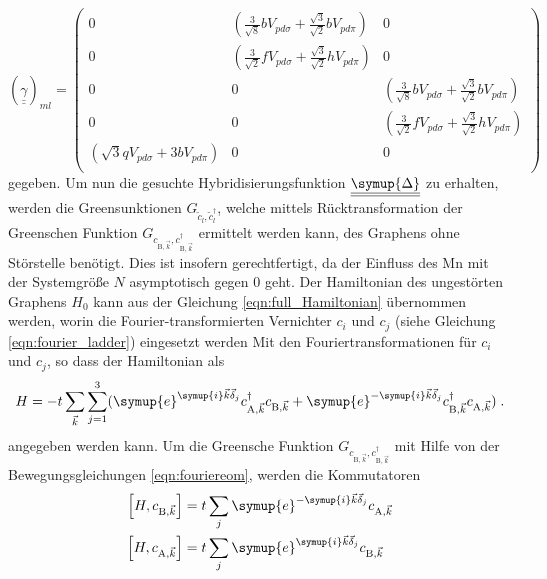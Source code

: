 \begin{equation*}
   \left (  \underline{\underline{\gamma}} \right )_{ml}= 
    \begin{pmatrix}
        0               & \left ( \frac{3}{\sqrt{8}} b V_{pd\sigma} + \frac{\sqrt{3}}{\sqrt{2}}  b   V_{pd\pi} \right )    &   0           \\
        0               & \left ( \frac{3}{\sqrt{2}} f V_{pd\sigma} + \frac{\sqrt{3}}{\sqrt{2}}  h   V_{pd\pi} \right )   &   0           \\
        0               & 0             &   \left ( \frac{3}{\sqrt{8}} b V_{pd\sigma} + \frac{\sqrt{3}}{\sqrt{2}}  b   V_{pd\pi} \right ) \\
        0               & 0             &   \left ( \frac{3}{\sqrt{2}} f V_{pd\sigma} + \frac{\sqrt{3}}{\sqrt{2}}  h   V_{pd\pi} \right ) \\
        \left (  \sqrt{3} q V_{pd\sigma} + 3 b V_{pd\pi} \right )     & 0             &   0           \\
    \end{pmatrix}
\end{equation*}
gegeben.
Um nun die gesuchte Hybridisierungsfunktion $\underline{\underline{\symup{\Delta}}}$ zu erhalten, werden die Greensunktionen
$G_{\tilde{c}_l, \tilde{c}_l^{\dagger}}$, welche mittels Rücktransformation der Greenschen Funktion 
$G_{c_{\text{B}, \vec{k}}, c_{\text{B}, \vec{k}}^\dagger}$ ermittelt werden kann, des Graphens ohne Störstelle benötigt.
Dies ist insofern gerechtfertigt, da der Einfluss des Mn mit der Systemgröße $N$ asymptotisch gegen 0 geht.
Der Hamiltonian des ungestörten Graphens $H_0$ kann aus der Gleichung \eqref{eqn:full_Hamiltonian} übernommen werden,
worin die Fourier-transformierten Vernichter $c_i$ und $c_j$ (siehe Gleichung \eqref{eqn:fourier_ladder}) eingesetzt werden
Mit den Fouriertransformationen für $c_i$ und $c_j$, so dass der Hamiltonian als 
\begin{equation}
    H = -t \sum_{\vec{k}}\sum_{j=1}^3( \symup{e}^{\symup{i}\vec{k}\vec{\delta}_j}c^\dagger_{\text{A},\vec{k}} c_{\text{B},\vec{k}} + \symup{e}^{-\symup{i}\vec{k}\vec{\delta}_j}c^\dagger_{\text{B},\vec{k}} c_{\text{A},\vec{k}} ) \; .
\end{equation} 
angegeben werden kann.
Um die Greensche Funktion $G_{c_{\text{B}, \vec{k}}, c_{\text{B}, \vec{k}}^\dagger}$ mit Hilfe von der Bewegungsgleichungen \eqref{eqn:fouriereom}, werden die Kommutatoren
\begin{align}
    \left [H,  c_{\text{B},\vec{k}} \right ] &= t \sum_j \symup{e}^{-\symup{i}\vec{k}\vec{\delta}_j} c_{\text{A},\vec{k}} \label{eqn:test} \\
    \left [H,  c_{\text{A},\vec{k}} \right ] &= t \sum_j \symup{e}^{\symup{i}\vec{k}\vec{\delta}_j} c_{\text{B},\vec{k}}
\end{align}
